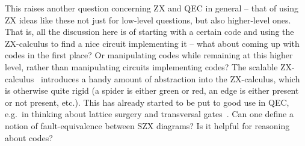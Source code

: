 This raises another question concerning ZX and QEC in general -- that of using ZX ideas like these not just for low-level questions, but also higher-level ones.
That is, all the discussion here is of starting with a certain code and using the ZX-calculus to find a nice circuit implementing it -- what about coming up with codes in the first place?
Or manipulating codes while remaining at this higher level, rather than manipulating circuits implementing codes?
The scalable ZX-calculus~\cite{Carette2019scalablezx} introduces a handy amount of abstraction into the ZX-calculus, which is otherwise quite rigid (a spider is either green or red, an edge is either present or not present, etc.).
This has already started to be put to good use in QEC, e.g.\ in thinking about lattice surgery and transversal gates~\cite{Kissinger_2024,cowtan2025fastfaulttolerantlogicalmeasurements}.
Can one define a notion of fault-equivalence between SZX diagrams?
Is it helpful for reasoning about codes?